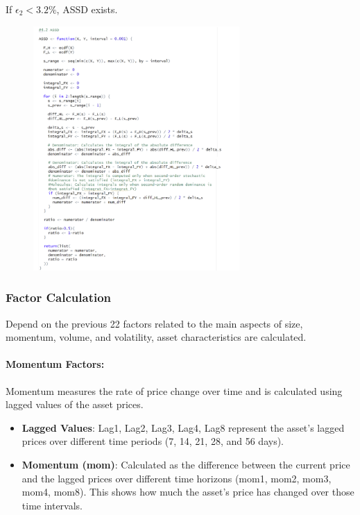 \documentclass{article}
\begin{document}
If $\epsilon_2 < 3.2\%$, ASSD exists.
\begin{figure}[H]
    \centering
    \includegraphics[width=0.7\textwidth]{12.png}
    \label{fig:example}
\end{figure}
\hypertarget{Factor Calculation}{%
\subsubsection{Factor Calculation}\label{Factor Calculation}}


Depend on the previous 22 factors related to the main aspects of size, momentum, volume, and volatility, asset characteristics are calculated.

\paragraph{Momentum Factors:}
Momentum measures the rate of price change over time and is calculated using lagged values of the asset prices.
\begin{itemize}
    \item \textbf{Lagged Values}: Lag1, Lag2, Lag3, Lag4, Lag8 represent the asset's lagged prices over different time periods (7, 14, 21, 28, and 56 days).
    \item \textbf{Momentum (mom)}: Calculated as the difference between the current price and the lagged prices over different time horizons (mom1, mom2, mom3, mom4, mom8). This shows how much the asset's price has changed over those time intervals.
\end{itemize}
\end{document}
